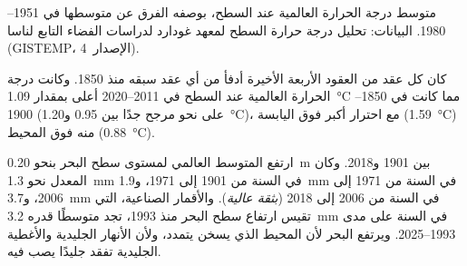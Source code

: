 \begin{omfigure}

{\small متوسط درجة الحرارة العالمية عند السطح، بوصفه الفرق عن متوسطها
في 1951--1980. البيانات: تحليل درجة حرارة السطح لمعهد غودارد لدراسات الفضاء التابع لناسا (GISTEMP، الإصدار~4).}
\end{omfigure}

\begin{proposition}\label{prop:g12:climate-change:warming}
كان كل عقد من العقود الأربعة الأخيرة أدفأ من أي عقد سبقه
منذ 1850. وكانت درجة الحرارة العالمية عند السطح في 2011--2020 أعلى بمقدار \qty{1.09}{\degreeCelsius}
مما كانت في 1850--1900 (على نحو مرجح جدًا بين 0.95
و\qty{1.20}{\degreeCelsius})، مع احترار أكبر فوق اليابسة
(\qty{1.59}{\degreeCelsius}) منه فوق المحيط (\qty{0.88}{\degreeCelsius}).
\end{proposition}

\begin{proposition}\label{prop:g12:climate-change:sea}
ارتفع المتوسط العالمي لمستوى سطح البحر بنحو \qty{0.20}{m} بين 1901 و2018.
وكان المعدل نحو \qty{1.3}{mm} في السنة من 1901 إلى 1971،
و\qty{1.9}{mm} في السنة من 1971 إلى 2006، و\qty{3.7}{mm} في السنة من
2006 إلى 2018 (\emph{بثقة عالية}). والأقمار الصناعية، التي تقيس ارتفاع
سطح البحر منذ 1993، تجد متوسطًا قدره \qty{3.2}{mm} في السنة على مدى
1993--2025. ويرتفع البحر لأن المحيط الذي يسخن يتمدد، ولأن
الأنهار الجليدية والأغطية الجليدية تفقد جليدًا يصب فيه.
\end{proposition}

